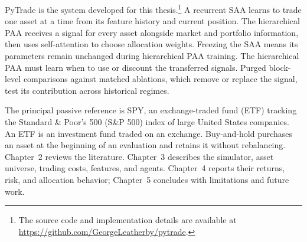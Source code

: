 PyTrade is the system developed for this thesis.\footnote{The source code and implementation details are available at \url{https://github.com/GeorgeLeatherby/pytrade}.} A recurrent SAA learns to trade one asset at a time from its feature history and current position. The hierarchical PAA receives a signal for every asset alongside market and portfolio information, then uses self-attention to choose allocation weights. Freezing the SAA means its parameters remain unchanged during hierarchical PAA training. The hierarchical PAA must learn when to use or discount the transferred signals. Purged block-level comparisons against matched ablations, which remove or replace the signal, test its contribution across historical regimes.

The principal passive reference is SPY, an exchange-traded fund (ETF) tracking the Standard \& Poor's 500 (S\&P 500) index of large United States companies. An ETF is an investment fund traded on an exchange. Buy-and-hold purchases an asset at the beginning of an evaluation and retains it without rebalancing. Chapter~2 reviews the literature. Chapter~3 describes the simulator, asset universe, trading costs, features, and agents. Chapter~4 reports their returns, risk, and allocation behavior; Chapter~5 concludes with limitations and future work.
